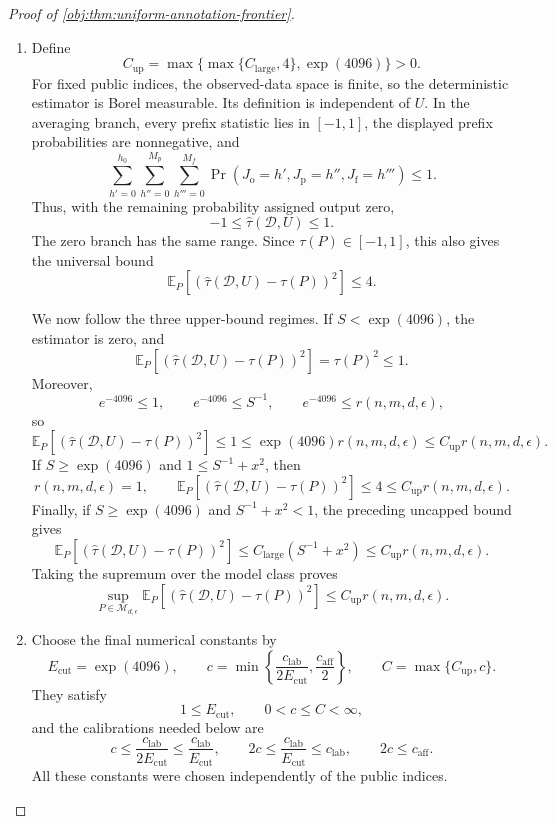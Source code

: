 \begin{proof}[Proof of \cref{obj:thm:uniform-annotation-frontier}]
\begin{enumerate}
\item Define
\[
C_{\mathrm{up}}
=\max\{\max\{C_{\mathrm{large}},4\},\exp(4096)\}>0.
\]
For fixed public indices, the observed-data space is finite, so the deterministic estimator is Borel measurable. Its definition is independent of \(U\). In the averaging branch, every prefix statistic lies in \([-1,1]\), the displayed prefix probabilities are nonnegative, and
\[
\sum_{h'=0}^{h_0}\sum_{h''=0}^{M_p}\sum_{h'''=0}^{M_f}
\Pr(J_{\mathrm o}=h',J_{\mathrm p}=h'',J_{\mathrm f}=h''')
\le1.
\]
Thus, with the remaining probability assigned output zero,
\[
-1\le\widehat\tau(\mathcal D,U)\le1.
\]
The zero branch has the same range. Since \(\tau(P)\in[-1,1]\), this also gives the universal bound
\[
\mathbb E_P[
(\widehat\tau(\mathcal D,U)-\tau(P))^2]\le4.
\]

We now follow the three upper-bound regimes. If \(S<\exp(4096)\), the estimator is zero, and
\[
\mathbb E_P[
(\widehat\tau(\mathcal D,U)-\tau(P))^2]
=\tau(P)^2\le1.
\]
Moreover,
\[
e^{-4096}\le1,\qquad e^{-4096}\le S^{-1},
\qquad
e^{-4096}\le r(n,m,d,\epsilon),
\]
so
\[
\mathbb E_P[
(\widehat\tau(\mathcal D,U)-\tau(P))^2]
\le1
\le\exp(4096)r(n,m,d,\epsilon)
\le C_{\mathrm{up}}r(n,m,d,\epsilon).
\]
If \(S\ge\exp(4096)\) and \(1\le S^{-1}+x^2\), then
\[
r(n,m,d,\epsilon)=1,
\qquad
\mathbb E_P[
(\widehat\tau(\mathcal D,U)-\tau(P))^2]
\le4\le C_{\mathrm{up}}r(n,m,d,\epsilon).
\]
Finally, if \(S\ge\exp(4096)\) and \(S^{-1}+x^2<1\), the preceding uncapped bound gives
\[
\mathbb E_P[
(\widehat\tau(\mathcal D,U)-\tau(P))^2]
\le C_{\mathrm{large}}(S^{-1}+x^2)
\le C_{\mathrm{up}}r(n,m,d,\epsilon).
\]
Taking the supremum over the model class proves
\[
\sup_{P\in\mathcal M_{d,\epsilon}}
\mathbb E_P[
(\widehat\tau(\mathcal D,U)-\tau(P))^2]
\le C_{\mathrm{up}}r(n,m,d,\epsilon).
\]

\item Choose the final numerical constants by
\[
E_{\mathrm{cut}}=\exp(4096),\qquad
c=\min\left\{
\frac{c_{\mathrm{lab}}}{2E_{\mathrm{cut}}},
\frac{c_{\mathrm{aff}}}{2}
\right\},
\qquad
C=\max\{C_{\mathrm{up}},c\}.
\]
They satisfy
\[
1\le E_{\mathrm{cut}},\qquad
0<c\le C<\infty,
\]
and the calibrations needed below are
\[
c\le\frac{c_{\mathrm{lab}}}{2E_{\mathrm{cut}}}
\le\frac{c_{\mathrm{lab}}}{E_{\mathrm{cut}}},
\qquad
2c\le\frac{c_{\mathrm{lab}}}{E_{\mathrm{cut}}}
\le c_{\mathrm{lab}},
\qquad
2c\le c_{\mathrm{aff}}.
\]
All these constants were chosen independently of the public indices.


\end{enumerate}
\end{proof}
